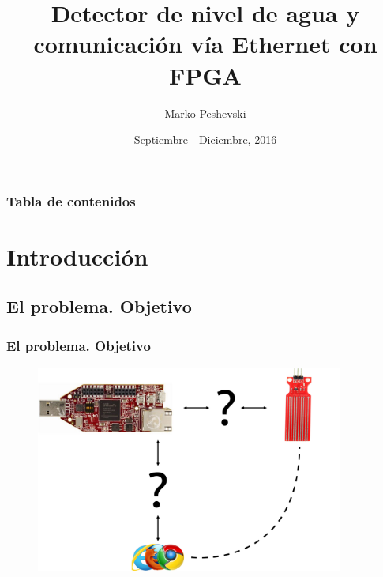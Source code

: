 \documentclass[compress]{beamer}
\title{Detector de nivel de agua y\\comunicaci\'on v\'ia Ethernet con FPGA}
\author{Marko Peshevski}
\institute{SDAV, MUESAEI}
\date{Septiembre - Diciembre, 2016}
\begin{document}
\begin{frame}[plain]
	\titlepage
\end{frame}

\begin{frame}
    \frametitle{Tabla de contenidos}
    \tableofcontents
\end{frame}

\setcounter{framenumber}{0}
\section{Introducci\'on}
	\subsection{El problema. Objetivo}
		\begin{frame}
			\frametitle{El problema. Objetivo}
				\begin{figure}
					\includegraphics[keepaspectratio = true, width=0.9\textwidth]{figuras/introduccion.png}
				\end{figure}
		\end{frame}
\end{document}
